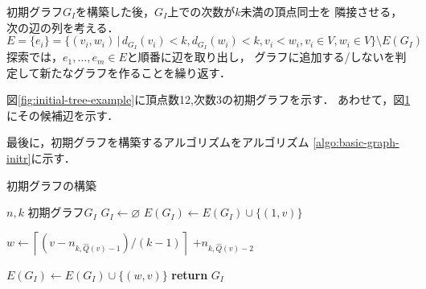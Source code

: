 初期グラフ$G_I$を構築した後，$G_I$上での次数が$k$未満の頂点同士を
隣接させる，次の辺の列を考える．
\[ E = \{e_i\} = \{(v_i,w_i)\,|\,
d_{G_I}(v_i)<k,d_{G_I}(w_i)<k,v_i<w_i,v_i\in V,w_i\in V\}
\setminus E(G_I) \]
探索では，$e_1,\ldots,e_m\in E$と順番に辺を取り出し，
グラフに追加する/しないを判定して新たなグラフを作ることを繰り返す．

\begin{example}
  図\ref{fig:initial-tree-example}に頂点数12,次数3の初期グラフを示す．
  あわせて，図\ref{fig:feasible-edges-example}にその候補辺を示す．
  \begin{figure}
    \centering
    \begin{minipage}{.4\columnwidth}
      \def\svgwidth{\textwidth}
      
      \label{fig:initial-tree-example}
    \end{minipage}
    \hfill
    \begin{minipage}{.4\columnwidth}
      \def\svgwidth{\textwidth}
      
      \label{fig:feasible-edges-example}
    \end{minipage}
  \end{figure}
\end{example}

最後に，初期グラフを構築するアルゴリズムをアルゴリズム
\ref{algo:basic-graph-initr}に示す．
\begin{algorithm}[H]
  \caption{初期グラフの構築}
  \label{algo:basic-graph-initr}
  \begin{algorithmic}[1]
    \Require $n,k$
    \Ensure 初期グラフ$G_I$
    \State $G_I\gets \varnothing$
    \State $E(G_I)\gets E(G_I)\cup\{(1,v)\}$
    \EndFor
    \State \parbox[t]{.6\linewidth}{
      $w\gets \left\lceil(v-n_{k,\hat{Q}(v)-1})/(k-1)\right\rceil$
      $+n_{k,\hat{Q}(v)-2}$
    }
    \State $E(G_I)\gets E(G_I)\cup\{(w,v)\}$
    \EndFor
    \State \textbf{return} $G_I$
    \EndProcedure
  \end{algorithmic}
\end{algorithm}

